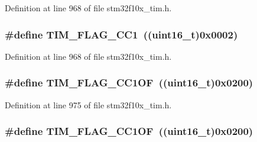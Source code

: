 Definition at line 968 of file stm32f10x\+\_\+tim.\+h.

\subsubsection[{\texorpdfstring{T\+I\+M\+\_\+\+F\+L\+A\+G\+\_\+\+C\+C1}{TIM_FLAG_CC1}}]{\setlength{\rightskip}{0pt plus 5cm}\#define T\+I\+M\+\_\+\+F\+L\+A\+G\+\_\+\+C\+C1~(({\bf uint16\+\_\+t})0x0002)}\hypertarget{group___t_i_m___flags_gaa7eb8be054b9bd217a9abb1c8687cc55}{}\label{group___t_i_m___flags_gaa7eb8be054b9bd217a9abb1c8687cc55}


Definition at line 968 of file stm32f10x\+\_\+tim.\+h.

\subsubsection[{\texorpdfstring{T\+I\+M\+\_\+\+F\+L\+A\+G\+\_\+\+C\+C1\+OF}{TIM_FLAG_CC1OF}}]{\setlength{\rightskip}{0pt plus 5cm}\#define T\+I\+M\+\_\+\+F\+L\+A\+G\+\_\+\+C\+C1\+OF~(({\bf uint16\+\_\+t})0x0200)}\hypertarget{group___t_i_m___flags_ga38dfb7d1ed00af77d70bc3be28500108}{}\label{group___t_i_m___flags_ga38dfb7d1ed00af77d70bc3be28500108}


Definition at line 975 of file stm32f10x\+\_\+tim.\+h.

\subsubsection[{\texorpdfstring{T\+I\+M\+\_\+\+F\+L\+A\+G\+\_\+\+C\+C1\+OF}{TIM_FLAG_CC1OF}}]{\setlength{\rightskip}{0pt plus 5cm}\#define T\+I\+M\+\_\+\+F\+L\+A\+G\+\_\+\+C\+C1\+OF~(({\bf uint16\+\_\+t})0x0200)}\hypertarget{group___t_i_m___flags_ga38dfb7d1ed00af77d70bc3be28500108}{}\label{group___t_i_m___flags_ga38dfb7d1ed00af77d70bc3be28500108}


